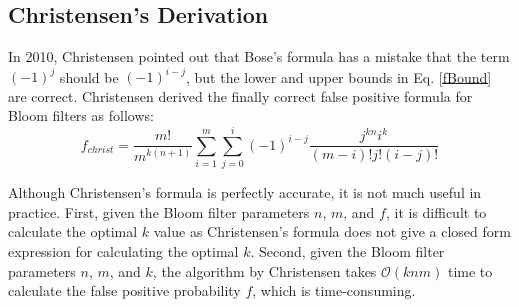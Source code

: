 
\presub
\subsection{Christensen's Derivation} \postsub
%
In 2010, Christensen \etal pointed out that Bose's formula has a mistake that the term $(-1)^j$ should be $(-1)^{i-j}$, but the lower and upper bounds in Eq. \ref{fBound} are correct. 
%
Christensen \etal derived the finally correct false positive formula for Bloom filters as follows:
%
\begin{equation}
\label{fChristen}
f_{christ}=\dfrac{m!}{m^{k(n+1)}}\sum\limits_{i=1}^{m} \sum\limits_{j=0}^{i} (-1)^{i-j}  \dfrac{j^{kn}i^k}{(m-i)!j!(i-j)!}
\end{equation}

Although Christensen's formula is perfectly accurate, it is not much useful in practice.
%
First, given the Bloom filter parameters $n$, $m$, and $f$, it is difficult to calculate the optimal $k$ value as Christensen's formula does not give a closed form expression for calculating the optimal $k$.
%
Second, given the Bloom filter parameters $n$, $m$, and $k$, the algorithm by Christensen \etal takes $\mathcal{O}(knm)$ time to calculate the false positive probability $f$, which is time-consuming.